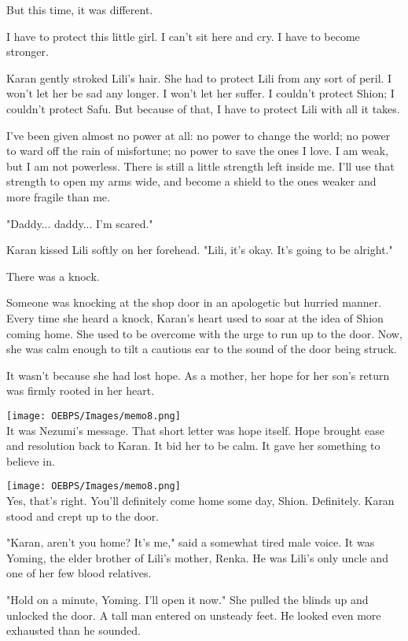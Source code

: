 But this time, it was different.

I have to protect this little girl. I can't sit here and cry. I have to
become stronger.

Karan gently stroked Lili's hair. She had to protect Lili from any sort
of peril. I won't let her be sad any longer. I won't let her suffer. I
couldn't protect Shion; I couldn't protect Safu. But because of that, I
have to protect Lili with all it takes.

I've been given almost no power at all: no power to change the world; no
power to ward off the rain of misfortune; no power to save the ones I
love. I am weak, but I am not powerless. There is still a little
strength left inside me. I'll use that strength to open my arms wide,
and become a shield to the ones weaker and more fragile than me.

"Daddy... daddy... I'm scared."

Karan kissed Lili softly on her forehead. "Lili, it's okay. It's going
to be alright."

There was a knock.

Someone was knocking at the shop door in an apologetic but hurried
manner. Every time she heard a knock, Karan's heart used to soar at the
idea of Shion coming home. She used to be overcome with the urge to run
up to the door. Now, she was calm enough to tilt a cautious ear to the
sound of the door being struck.

It wasn't because she had lost hope. As a mother, her hope for her son's
return was firmly rooted in her heart.

\texttt{[image: OEBPS/Images/memo8.png]}\\

It was Nezumi's message. That short letter was hope itself. Hope brought
ease and resolution back to Karan. It bid her to be calm. It gave her
something to believe in.

\texttt{[image: OEBPS/Images/memo8.png]}\\

Yes, that's right. You'll definitely come home some day, Shion.
Definitely. Karan stood and crept up to the door.

"Karan, aren't you home? It's me," said a somewhat tired male voice. It
was Yoming, the elder brother of Lili's mother, Renka. He was Lili's
only uncle and one of her few blood relatives.

"Hold on a minute, Yoming. I'll open it now." She pulled the blinds up
and unlocked the door. A tall man entered on unsteady feet. He looked
even more exhausted than he sounded.

